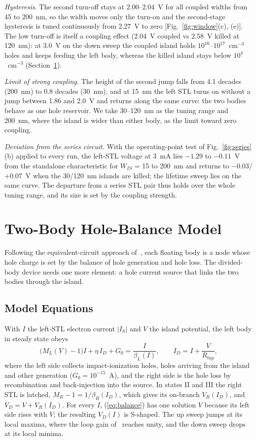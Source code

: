 \documentclass[journal]{IEEEtran}
\begin{document}
\textit{Hysteresis.} The second turn-off stays at 2.00--2.04~V for all coupled widths from 45 to 200~nm, so the width moves only the turn-on and the second-stage hysteresis is tuned continuously from 2.27~V to zero [Fig.~\ref{fig:window}(c), (e)]. The low turn-off is itself a coupling effect (2.04~V coupled vs 2.58~V killed at 120~nm): at 3.0~V on the down sweep the coupled island holds $10^{16}$--$10^{17}$~cm$^{-3}$ holes and keeps feeding the left body, whereas the killed island stays below $10^{4}$~cm$^{-3}$ (Section~\ref{sec:model}).

\textit{Limit of strong coupling.} The height of the second jump falls from 4.1 decades (200~nm) to 0.8 decades (30~nm), and at 15~nm the left STL turns on without a jump between 1.86 and 2.0~V and returns along the same curve: the two bodies behave as one hole reservoir. We take 30--120~nm as the tuning range and 200~nm, where the island is wider than either body, as the limit toward zero coupling.

\textit{Deviation from the series circuit.} With the operating-point test of Fig.~\ref{fig:series}(b) applied to every run, the left-STL voltage at 3~mA lies $-1.29$ to $-0.11$~V from the standalone characteristic for $W_{IS}$ = 15 to 200~nm and returns to $-0.03$/$+0.07$~V when the 30/120~nm islands are killed; the lifetime sweep lies on the same curve. The departure from a series STL pair thus holds over the whole tuning range, and its size is set by the coupling strength.


\section{Two-Body Hole-Balance Model}
\label{sec:model}
Following the equivalent-circuit approach of~\cite{park_stl}, each floating body is a node whose hole charge is set by the balance of hole generation and hole loss. The divided-body device needs one more element: a hole current source that links the two bodies through the island.

\subsection{Model Equations}
With $I$ the left-STL electron current $|I_S|$ and $V$ the island potential, the left body in steady state obeys
\begin{equation}
\bigl(M_L(V)-1\bigr)I+\eta\,I_D+G_0=\frac{I}{\beta_L(I)},\qquad I_D=I+\frac{V}{R_{tap}},
\label{eq:balance}
\end{equation}
where the left side collects impact-ionization holes, holes arriving from the island and other generation ($G_0=10^{-15}$~A), and the right side is the hole loss by recombination and back-injection into the source. In states II and III the right STL is latched, $M_R-1=1/\beta_R(I_D)$, which gives its on-branch $V_R(I_D)$, and $V_D=V+V_R(I_D)$. For every $I$, (\ref{eq:balance}) has one solution $V$ because its left side rises with $V$; the resulting $V_D(I)$ is S-shaped. The up sweep jumps at its local maxima, where the loop gain of~\cite{park_stl} reaches unity, and the down sweep drops at its local minima.
\end{document}
